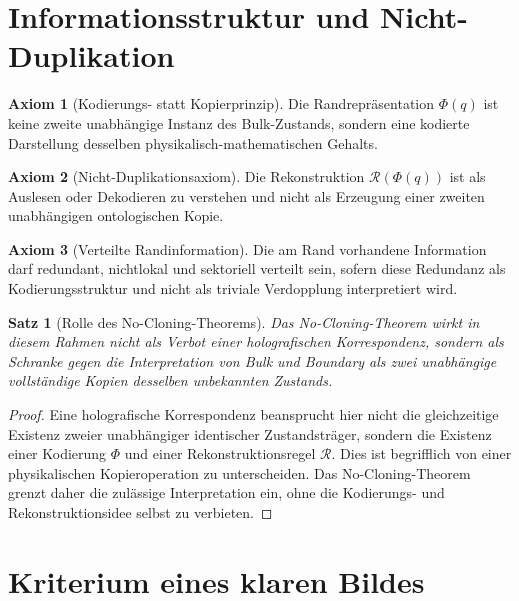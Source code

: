 \documentclass[11pt,a4paper]{article}
\newtheorem{satz}{Satz}
\theoremstyle{definition}
\newtheorem{axiom}{Axiom}
\theoremstyle{remark}
\begin{document}
\section{Informationsstruktur und Nicht-Duplikation}

\begin{axiom}[Kodierungs- statt Kopierprinzip]
Die Randrepräsentation $\Phi(q)$ ist keine zweite unabhängige Instanz des Bulk-Zustands, sondern eine kodierte Darstellung desselben physikalisch-mathematischen Gehalts.
\end{axiom}

\begin{axiom}[Nicht-Duplikationsaxiom]
Die Rekonstruktion $\mathcal{R}(\Phi(q))$ ist als Auslesen oder Dekodieren zu verstehen und nicht als Erzeugung einer zweiten unabhängigen ontologischen Kopie.
\end{axiom}

\begin{axiom}[Verteilte Randinformation]
Die am Rand vorhandene Information darf redundant, nichtlokal und sektoriell verteilt sein, sofern diese Redundanz als Kodierungsstruktur und nicht als triviale Verdopplung interpretiert wird.
\end{axiom}

\begin{satz}[Rolle des No-Cloning-Theorems]
Das No-Cloning-Theorem wirkt in diesem Rahmen nicht als Verbot einer holografischen Korrespondenz, sondern als Schranke gegen die Interpretation von Bulk und Boundary als zwei unabhängige vollständige Kopien desselben unbekannten Zustands.
\end{satz}

\begin{proof}
Eine holografische Korrespondenz beansprucht hier nicht die gleichzeitige Existenz zweier unabhängiger identischer Zustandsträger, sondern die Existenz einer Kodierung $\Phi$ und einer Rekonstruktionsregel $\mathcal{R}$. Dies ist begrifflich von einer physikalischen Kopieroperation zu unterscheiden. Das No-Cloning-Theorem grenzt daher die zulässige Interpretation ein, ohne die Kodierungs- und Rekonstruktionsidee selbst zu verbieten.
\end{proof}

\section{Kriterium eines klaren Bildes}
\end{document}
